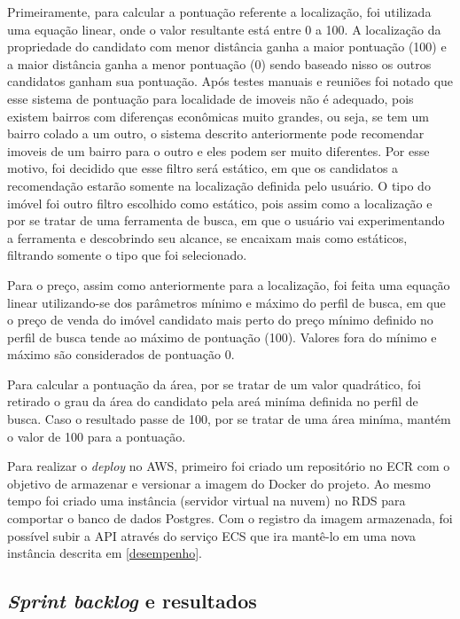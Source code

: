Primeiramente, para calcular a pontuação referente a localização, foi utilizada uma equação linear, onde o valor resultante está entre 0 a 100. A localização da propriedade do candidato com menor distância ganha a maior pontuação (100) e a maior distância ganha a menor pontuação (0) sendo baseado nisso os outros candidatos ganham sua pontuação. Após testes manuais e reuniões foi notado que esse sistema de pontuação para localidade de imoveis não é adequado, pois existem bairros com diferenças econômicas muito grandes, ou seja, se tem um bairro colado a um outro, o sistema descrito anteriormente pode recomendar imoveis de um bairro para o outro e eles podem ser muito diferentes. Por esse motivo, foi decidido que esse filtro será estático, em que os candidatos a recomendação estarão somente na localização definida pelo usuário. O tipo do imóvel foi outro filtro escolhido como estático, pois assim como a localização e por se tratar de uma ferramenta de busca, em que o usuário vai experimentando a ferramenta e descobrindo seu alcance, se encaixam mais como estáticos, filtrando somente o tipo que foi selecionado.

Para o preço, assim como anteriormente para a localização, foi feita uma equação linear utilizando-se dos parâmetros mínimo e máximo do perfil de busca, em que o preço de venda do imóvel candidato mais perto do preço mínimo definido no perfil de busca tende ao máximo de pontuação (100). Valores fora do mínimo e máximo são considerados de pontuação 0.

Para calcular a pontuação da área, por se tratar de um valor quadrático, foi retirado o grau da área do candidato pela areá miníma definida no perfil de busca. Caso o resultado passe de 100, por se tratar de uma área miníma, mantém o valor de 100 para a pontuação.

Para realizar o \textit{deploy} no AWS, primeiro foi criado um repositório no ECR com o objetivo de armazenar e versionar a imagem do Docker do projeto. Ao mesmo tempo foi criado uma instância (servidor virtual na nuvem) no RDS para comportar o banco de dados Postgres. Com o registro da imagem armazenada, foi possível subir a API através do serviço ECS que ira mantê-lo em uma nova instância descrita em \ref{desempenho}.

\subsection{\textit{Sprint backlog} e resultados}

